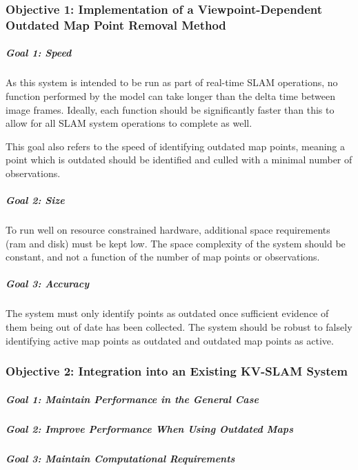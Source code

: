 \subsubsection*{Objective 1: Implementation of a Viewpoint-Dependent Outdated Map Point Removal Method}

\subparagraph{Goal 1: Speed}

As this system is intended to be run as part of real-time SLAM operations, no function performed by the model can take longer than the delta time between image frames. Ideally, each function should be significantly faster than this to allow for all SLAM system operations to complete as well.

This goal also refers to the speed of identifying outdated map points, meaning a point which is outdated should be identified and culled with a minimal number of observations.

\subparagraph{Goal 2: Size}

To run well on resource constrained hardware, additional space requirements (ram and disk) must be kept low. The space complexity of the system should be constant, and not a function of the number of map points or observations.

\subparagraph{Goal 3: Accuracy}

The system must only identify points as outdated once sufficient evidence of them being out of date has been collected. The system should be robust to falsely identifying active map points as outdated and outdated map points as active.

\subsubsection*{Objective 2: Integration into an Existing KV-SLAM System}

\subparagraph{Goal 1: Maintain Performance in the General Case}
\subparagraph{Goal 2: Improve Performance When Using Outdated Maps}
\subparagraph{Goal 3: Maintain Computational Requirements}




